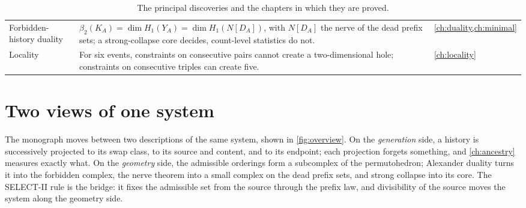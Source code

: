 \begin{table}[ht]
\begin{tabularx}{\textwidth}{@{}>{\raggedright\arraybackslash}p{3.0cm}>{\raggedright\arraybackslash}X>{\raggedright\arraybackslash}p{1.9cm}@{}}
Forbidden-history duality & $\beta_2(K_A)=\dim H_1(Y_A)=\dim H_1(N[D_A])$, with $N[D_A]$ the nerve of the dead prefix sets; a strong-collapse core decides, count-level statistics do not. & \cref{ch:duality,ch:minimal}\\
Locality & For six events, constraints on consecutive pairs cannot create a two-dimensional hole; constraints on consecutive triples can create five. & \cref{ch:locality}\\
\bottomrule
\end{tabularx}
\caption{The principal discoveries and the chapters in which they are proved.}\label{tab:found}
\end{table}

\section{Two views of one system}
The monograph moves between two descriptions of the same system, shown in \cref{fig:overview}. On the \emph{generation} side, a history is successively projected to its swap class, to its source and content, and to its endpoint; each projection forgets something, and \cref{ch:ancestry} measures exactly what. On the \emph{geometry} side, the admissible orderings form a subcomplex of the permutohedron; Alexander duality turns it into the forbidden complex, the nerve theorem into a small complex on the dead prefix sets, and strong collapse into its core. The SELECT-II rule is the bridge: it fixes the admissible set from the source through the prefix law, and divisibility of the source moves the system along the geometry side.


